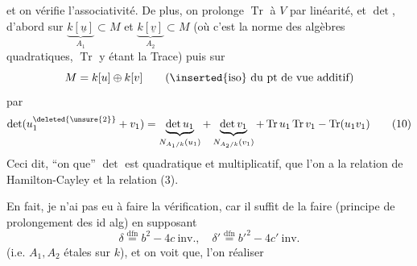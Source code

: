 et on vérifie l'associativité. De plus, on prolonge $\operatorname{Tr}$ à $V$ par linéarité, et $\det$,  d'abord sur $\underbrace{k[\underline u]}_{A_1}\subset M$ et $\underbrace{k[\underline v]}_{A_2}\subset M$ (où c'est  la norme des algèbres quadratiques, $\operatorname{Tr}$ y étant la Trace) puis sur
\[ M=k[u]\oplus k[v]\qquad\text{(}\inserted{\text{iso}}\ \text{du }\text{pt de vue}\ \text{additif)} \]
par
\[ \det(u_1^{\deleted{\unsure{2}}}+v_1)=\underbrace{\det u_1}_{N_{A_1/k}(u_1)}+\underbrace{\det v_1}_{N_{A_2/k}(v_1)}+\operatorname{Tr}u_1\operatorname{Tr}v_1-\operatorname{Tr}(u_1v_1) \tag*{(10)} \]
Ceci dit, ``on  que'' $\det$ est quadratique et multiplicatif, que l'on a la relation de Hamilton-Cayley et la relation (3).

En fait, je n'ai pas eu à faire la vérification, car  il suffit de la faire (principe de prolongement des id alg)  en supposant
\[ \delta\overset{\text{dfn}}{=}b^2-4c\ \text{inv.},\quad \delta'\overset{\text{dfn}}{=}b'^2-4c'\ \text{inv.} \]
(i.e. $A_1,A_2$ étales sur $k$), et on  voit que,  l'on  réaliser 
